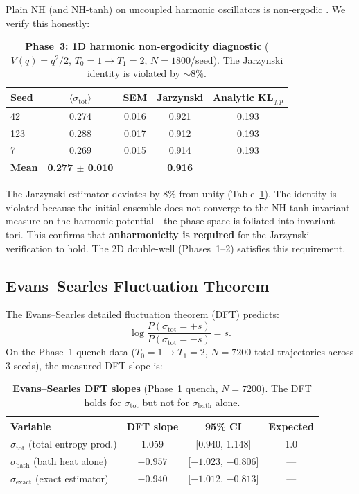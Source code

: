 \documentclass[11pt]{article}
\newcommand{\sbath}{\sigma_{\mathrm{bath}}}
\newcommand{\sexact}{\sigma_{\mathrm{exact}}}
\newcommand{\stot}{\sigma_{\mathrm{tot}}}
\begin{document}
Plain NH (and NH-tanh) on uncoupled harmonic oscillators is non-ergodic
\citep{legoll2009nonergodicity, martyna1992nose}. We verify this honestly:

\begin{table}[h]
  \centering
  \caption{\textbf{Phase~3: 1D harmonic non-ergodicity diagnostic}
    ($V(q) = q^2/2$, $T_0{=}1 \to T_1{=}2$, $N{=}1800$/seed). The Jarzynski
    identity is violated by ${\sim}8\%$.}
  \label{tab:phase3}
  \small
  \begin{tabular}{lcccc}
    \toprule
    Seed & $\langle \stot \rangle$ & SEM & Jarzynski & Analytic KL$_{q,p}$ \\
    \midrule
    42  & 0.274 & 0.016 & 0.921 & 0.193 \\
    123 & 0.288 & 0.017 & 0.912 & 0.193 \\
    7   & 0.269 & 0.015 & 0.914 & 0.193 \\
    \midrule
    \textbf{Mean} & \textbf{0.277 $\pm$ 0.010}
      & & \textbf{0.916} & \\
    \bottomrule
  \end{tabular}
\end{table}

The Jarzynski estimator deviates by $8\%$ from unity
(Table~\ref{tab:phase3}). The identity is violated because the initial
ensemble does not converge to the NH-tanh invariant measure on the harmonic
potential---the phase space is foliated into invariant tori. This confirms
that \textbf{anharmonicity is required} for the Jarzynski verification to hold.
The 2D double-well (Phases~1--2) satisfies this requirement.

\subsection{Evans--Searles Fluctuation Theorem}
\label{sec:dft}

The Evans--Searles detailed fluctuation theorem (DFT)
\citep{evans2002fluctuation} predicts:
\begin{equation}
  \log \frac{P(\stot = +s)}{P(\stot = -s)} = s.
  \label{eq:dft}
\end{equation}
On the Phase~1 quench data ($T_0{=}1 \to T_1{=}2$, $N{=}7200$ total
trajectories across 3 seeds), the measured DFT slope is:

\begin{table}[h]
  \centering
  \caption{\textbf{Evans--Searles DFT slopes} (Phase~1 quench, $N{=}7200$).
    The DFT holds for $\stot$ but not for $\sbath$ alone.}
  \label{tab:dft}
  \small
  \begin{tabular}{lccc}
    \toprule
    Variable & DFT slope & 95\% CI & Expected \\
    \midrule
    $\stot$ (total entropy prod.) & 1.059 & [0.940, 1.148] & 1.0 \\
    $\sbath$ (bath heat alone) & $-0.957$ & [$-1.023$, $-0.806$] & --- \\
    $\sexact$ (exact estimator) & $-0.940$ & [$-1.012$, $-0.813$] & --- \\
    \bottomrule
  \end{tabular}
\end{table}
\end{document}

